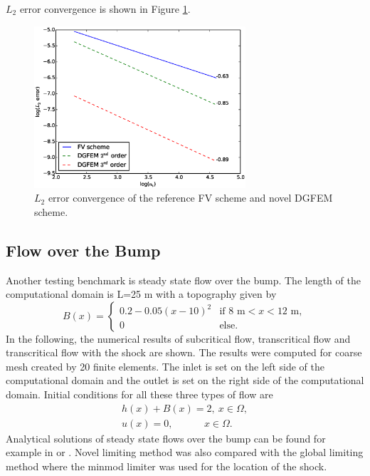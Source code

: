 $L_2$ error convergence is shown in Figure \ref{ParL2}.
\begin{figure}
\centering
\includegraphics[width=0.7\textwidth]{OBR/ParL2.eps}
\caption{$L_2$ error convergence of the reference FV scheme and novel DGFEM scheme.}\label{ParL2}
\end{figure}

\subsection{Flow over the Bump}
 Another testing benchmark is steady state flow over the bump. The length of the computational domain is L=25 m with a topography given by
\begin{equation}
B(x)=\begin{cases}
 0.2-0.05(x-10)^2  & \text{if 8 m} < x < \text{12 m},\\
0  & \text{else.}
\end{cases}
\end{equation}
In the following, the numerical results of subcritical flow, transcritical flow and transcritical flow with the shock are shown. The results were computed for coarse mesh created by 20 finite elements. The inlet is set on the left side of the computational domain and the outlet is set on the right side of the computational domain. Initial conditions for all these three types of flow are 
\begin{equation}
\begin{array}{ccc}
h(x)+B(x)=2,  \  x\in \Omega,\\
u(x)=0, \ \ \  \qquad \  \  x\in \Omega.
\end{array}
\end{equation}
Analytical solutions of steady state flows over the bump can be found for example in \cite{swashe} or \cite{henderson}. Novel limiting method was also compared with the global limiting method where the minmod limiter was used for the location of the shock.
 
